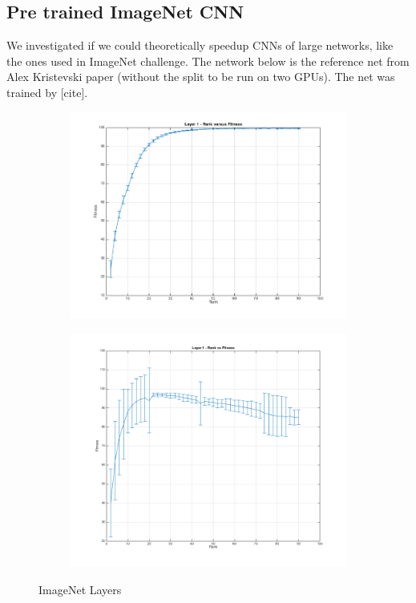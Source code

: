 \subsection{Pre trained ImageNet CNN}
We investigated if we could theoretically speedup CNNs of large networks, like the ones used in ImageNet challenge. The network below is the reference net from Alex Kristevski paper (without the split to be run on two GPUs). The net was trained by [cite].
\begin{figure}[h]
  \centering
  \begin{subfigure}[b]{0.40\textwidth}
   \includegraphics[width=\textwidth]{images/Layer1ImageNet.png}
    \caption{}
  \end{subfigure}
  \begin{subfigure}[b]{0.40\textwidth}
    \includegraphics[width=\textwidth]{images/Layer2ImageNet.png}
    \caption{}
  \end{subfigure}
  \caption{ImageNet Layers}
  \label{fig:user_stribution}
\end{figure}
